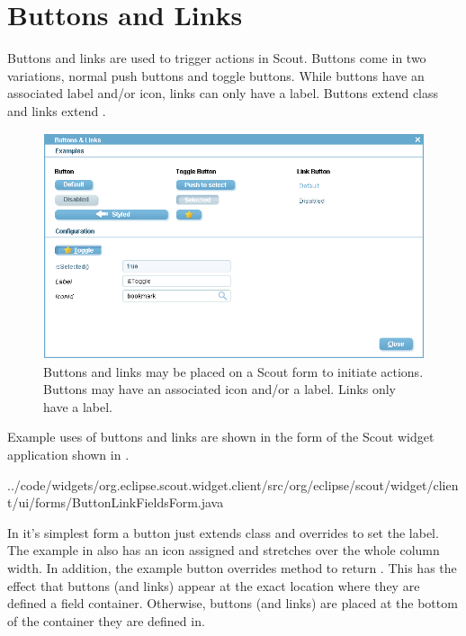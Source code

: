 \documentclass[a4paper,10pt,twoside]{book}
\begin{document}
{%
\section{Buttons and Links}

Buttons and links are used to trigger actions in Scout. 
Buttons come in two variations, normal push buttons and toggle buttons. 
While buttons have an associated label and/or icon, links can only have a label. 
Buttons extend class  and links extend . 

\begin{figure}
\includegraphics[width=15cm]{buttonlink.png}
\caption{Buttons and links may be placed on a Scout form to initiate actions.
Buttons may have an associated icon and/or a label.
Links only have a label.}
\end{figure}

Example uses of buttons and links are shown in the form  of the Scout widget application shown in . 


{../code/widgets/org.eclipse.scout.widget.client/src/org/eclipse/scout/widget/client/ui/forms/ButtonLinkFieldsForm.java}

In it's simplest form a button just extends class  and overrides  to set the label. 
The example in  also has an icon assigned and stretches over the whole column width. 
In addition, the example button overrides method  to return . 
This has the effect that buttons (and links) appear at the exact location where they are defined a field container. 
Otherwise, buttons (and links) are placed at the bottom of the container they are defined in. 

}
\end{document}
